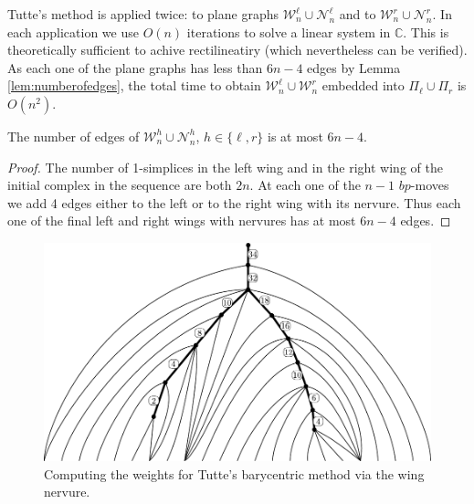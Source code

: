 Tutte's method is applied twice: to plane graphs $\mathcal{W}_n^\ell \cup \mathcal{N}_n^\ell$ and to $\mathcal{W}_n^r \cup \mathcal{N}_n^r.$
In each application we use $O(n)$ iterations to solve a linear system in $\mathbb{C}$. This is theoretically sufficient
to achive rectilineatiry (which nevertheless can be verified). As each one of the plane graphs has less than $6n-4$ edges by Lemma \ref{lem:numberofedges}, 
the total time to obtain $\mathcal{W}_n^\ell \cup \mathcal{W}_n^r$ embedded into $\Pi_\ell \cup \Pi_r$ is $O(n^2)$.

\begin{lemma}\label{lem:numberofedges}
 The number of edges of $\mathcal{W}_n^h \cup \mathcal{N}_n^h$, $h \in \{\ell,r\}$
is at most $6n-4$.
\end{lemma}
\begin{proof}
The number of 1-simplices in the left wing and in the right wing of the 
initial complex in the sequence are both $2n$. At each one of the $n-1$ $bp$-moves
we add 4 edges either to the left or to the right wing with its nervure.
Thus each one of the final left and right wings with nervures has at most $6n-4$ edges.
\end{proof}

\begin{figure}[!htb]
\begin{center}
\includegraphics[width=13cm]{A.figs/arvorecompesos.pdf}
\caption{Computing the weights for Tutte's barycentric method via the wing nervure.}
\label{fig:arvorecompesos}
\end{center}
\end{figure}

